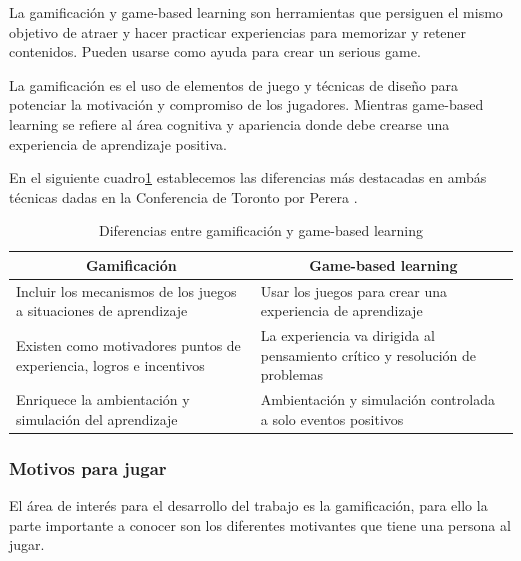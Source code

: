 La gamificación y game-based learning son herramientas que persiguen el mismo objetivo de atraer y hacer practicar experiencias para memorizar y retener contenidos. Pueden usarse como ayuda para crear un serious game.

La gamificación es el uso de elementos de juego y técnicas de diseño para potenciar la motivación y compromiso de los jugadores. Mientras game-based learning se refiere al área cognitiva y apariencia donde debe crearse una experiencia de aprendizaje positiva.

En el siguiente cuadro\ref{gabale} establecemos las diferencias más destacadas en ambás técnicas dadas en la Conferencia de Toronto por Perera \cite{jorgepereragonzalez2016}.

\begin{table}[htbp]
	\centering
	\caption{Diferencias entre gamificación y game-based learning}
	\label{gabale}
\begin{tabular}{|l|l|}
	\hline
	\multicolumn{1}{|c|}{\textbf{Gamificación}}                         & \multicolumn{1}{c|}{\textbf{Game-based learning}}                           \\ \hline
	Incluir los mecanismos de los juegos a situaciones de aprendizaje   & Usar los juegos para crear una experiencia de aprendizaje                   \\ \hline
	Existen como motivadores puntos de experiencia, logros e incentivos & La experiencia va dirigida al pensamiento crítico y resolución de problemas \\ \hline
	Enriquece la ambientación y simulación del aprendizaje              & Ambientación y simulación controlada a solo eventos positivos               \\ \hline
\end{tabular}
\end{table}

\subsubsection{Motivos para jugar}
El área de interés para el desarrollo del trabajo es la gamificación, para ello la parte importante a conocer son los diferentes motivantes que tiene una persona al jugar.

